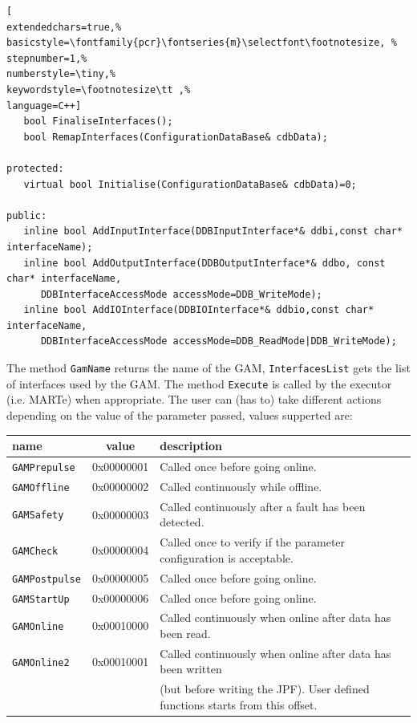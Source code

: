 \begin{lstlisting}[
extendedchars=true,%
basicstyle=\fontfamily{pcr}\fontseries{m}\selectfont\footnotesize, %
stepnumber=1,%
numberstyle=\tiny,%
keywordstyle=\footnotesize\tt ,%
language=C++]
   bool FinaliseInterfaces();
   bool RemapInterfaces(ConfigurationDataBase& cdbData);

protected:
   virtual bool Initialise(ConfigurationDataBase& cdbData)=0;

public:
   inline bool AddInputInterface(DDBInputInterface*& ddbi,const char* interfaceName);
   inline bool AddOutputInterface(DDBOutputInterface*& ddbo, const char* interfaceName,
      DDBInterfaceAccessMode accessMode=DDB_WriteMode);
   inline bool AddIOInterface(DDBIOInterface*& ddbio,const char* interfaceName,
      DDBInterfaceAccessMode accessMode=DDB_ReadMode|DDB_WriteMode);
\end{lstlisting}

The method \texttt{GamName} returns the name of the GAM, \texttt{InterfacesList} gets the list of interfaces used by the GAM.
The method \texttt{Execute} is called by the executor (i.e. MARTe) when appropriate. The user can (has to) take different actions depending on the value of the parameter passed, values supperted are:


\begin{table}[!h]
 \begin{center}
  \begin{tabular}{|l|c|l|}
   \hline
name & value & description \\
   \hline
\texttt{GAMPrepulse} & 0x00000001 & Called once before going online. \\
\texttt{GAMOffline} & 0x00000002 & Called continuously while offline. \\ 
\texttt{GAMSafety} & 0x00000003 & Called continuously after a fault has been detected. \\
\texttt{GAMCheck} & 0x00000004 & Called once to verify if the parameter configuration is acceptable. \\
\texttt{GAMPostpulse} & 0x00000005 & Called once before going online. \\
\texttt{GAMStartUp} & 0x00000006 & Called once before going online. \\
\texttt{GAMOnline} & 0x00010000 & Called continuously when online after data has been read. \\
\texttt{GAMOnline2} & 0x00010001 & Called continuously when online after data has been written \\
 & & (but before writing the JPF). User defined functions starts from this offset. \\
   \hline
  \end{tabular}
 \end{center}
\end{table}

